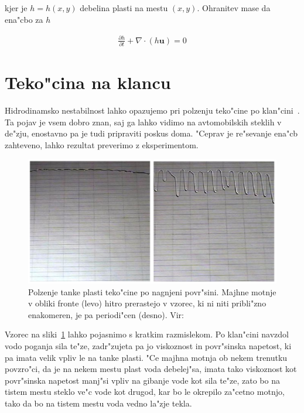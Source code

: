 \documentclass[a4paper,10pt]{article}
\renewcommand{\vec}{\mathbf}
\begin{document}
kjer je $h = h(x,y)$ debelina plasti na mestu $(x,y)$. Ohranitev mase da ena"cbo za $h$

\begin{align}
  \frac{\partial h}{\partial t} + \nabla\cdot(h\vec u) = 0
\end{align}



\section{Teko"cina na klancu}

Hidrodinamsko nestabilnost lahko opazujemo pri polzenju teko"cine po klan"cini~\cite{kondic}. Ta pojav je vsem dobro znan, saj ga lahko vidimo na avtomobilskih steklih v de"zju, enostavno pa je tudi pripraviti poskus doma. "Ceprav je re"sevanje ena"cb zahteveno, lahko rezultat preverimo z eksperimentom. 

\begin{figure}[h]
\centering
 \includegraphics[width=.9\textwidth]{./Slike/film-slika}
\caption{Polzenje tanke plasti teko"cine po nagnjeni povr"sini. Majhne motnje v obliki fronte (levo) hitro prerastejo v vzorec, ki ni niti pribli"zno enakomeren, je pa periodi"cen (desno). Vir: \cite{kondic}}
\label{fig:film-neenakomernost}
\end{figure}

Vzorec na sliki~\ref{fig:film-neenakomernost} lahko pojasnimo s kratkim razmislekom. Po klan"cini navzdol vodo poganja sila te"ze, zadr"zujeta pa jo viskoznost in povr"sinska napetost, ki pa imata velik vpliv le na tanke plasti. "Ce majhna motnja ob nekem trenutku povzro"ci, da je na nekem mestu plast voda debelej"sa, imata tako viskoznost kot povr"sinska napetost manj"si vpliv na gibanje vode kot sila te"ze, zato bo na tistem mestu steklo ve"c vode kot drugod, kar bo le okrepilo za"cetno motnjo, tako da bo na tistem mestu voda vedno la"zje tekla. 
\end{document}
